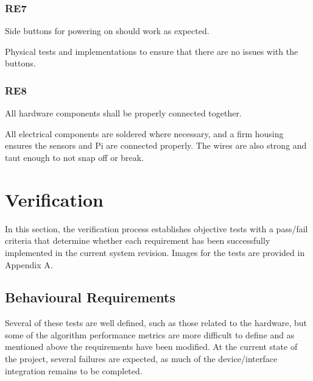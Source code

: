\documentclass[11pt]{article}
\begin{document}
    \subsubsection{RE7}
    
	\begin{exampleblock}
        Side buttons for powering on should work as expected.
    \end{exampleblock}

    Physical tests and implementations to ensure that there are no issues with the buttons.

    \subsubsection{RE8}

    \begin{exampleblock}
        All hardware components shall be properly connected together.
    \end{exampleblock}

    All electrical components are soldered where necessary, and a firm housing ensures the sensors and Pi are connected properly. The wires are also strong and taut enough to not snap off or break.
    
	\section{Verification}
	
	In this section, the verification process establishes objective tests with a pass/fail criteria that determine whether each requirement has been successfully implemented in the current system revision. Images for the tests are provided in Appendix A.
	
	\subsection{Behavioural Requirements} 
	
	Several of these tests are well defined, such as those related to the hardware, but some of the algorithm performance metrics are more difficult to define and as mentioned above the requirements have been modified. At the current state of the project, several failures are expected, as much of the device/interface integration remains to be completed. 
	
\end{document}
